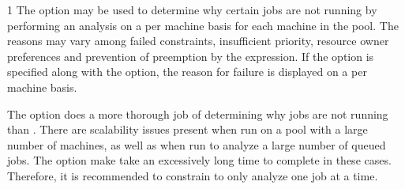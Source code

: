 \begin{ManPage}{\label{man-condor-q}}{1}
The  option may be used to determine why certain jobs are not
running by performing an analysis on a per machine basis for each machine in 
the pool.  The reasons may vary among failed constraints, insufficient priority,
resource owner preferences and prevention of preemption by the 
 expression.  If the  option is specified 
along with the  option, the reason for failure is displayed on a 
per machine basis.

The  option does a more thorough job of determining
why jobs are not running than .
There are scalability issues present when run on a pool with
a large number of machines,
as well as when run to analyze a large number of queued jobs.
The  option make take an excessively long time
to complete in these cases.
Therefore, it is recommended to constrain  
to only analyze one job at a time.


\end{ManPage}
